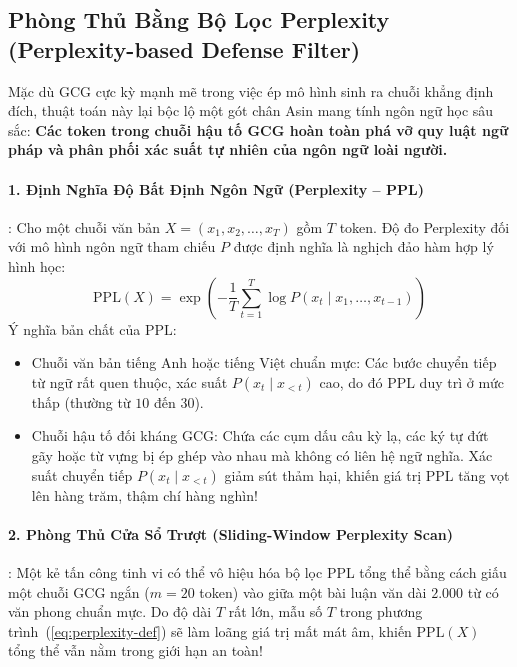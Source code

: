 \subsection{Phòng Thủ Bằng Bộ Lọc Perplexity (Perplexity-based Defense Filter)}
\label{subsec:perplexity-defense}

Mặc dù GCG cực kỳ mạnh mẽ trong việc ép mô hình sinh ra chuỗi khẳng định đích, thuật toán này lại bộc lộ một gót chân Asin mang tính ngôn ngữ học sâu sắc: \textbf{Các token trong chuỗi hậu tố GCG hoàn toàn phá vỡ quy luật ngữ pháp và phân phối xác suất tự nhiên của ngôn ngữ loài người.}

\paragraph{1. Định Nghĩa Độ Bất Định Ngôn Ngữ (Perplexity -- PPL)}:
Cho một chuỗi văn bản $X = (x_1, x_2, \dots, x_T)$ gồm $T$ token. Độ đo Perplexity đối với mô hình ngôn ngữ tham chiếu $P$ được định nghĩa là nghịch đảo hàm hợp lý hình học:
\begin{equation}
\text{PPL}(X) = \exp \left( - \frac{1}{T} \sum_{t=1}^T \log P(x_t \mid x_1, \dots, x_{t-1}) \right)
\label{eq:perplexity-def}
\end{equation}
Ý nghĩa bản chất của $\text{PPL}$:
\begin{itemize}
  \item Chuỗi văn bản tiếng Anh hoặc tiếng Việt chuẩn mực: Các bước chuyển tiếp từ ngữ rất quen thuộc, xác suất $P(x_t \mid x_{<t})$ cao, do đó $\text{PPL}$ duy trì ở mức thấp (thường từ $10$ đến $30$).
  \item Chuỗi hậu tố đối kháng GCG: Chứa các cụm dấu câu kỳ lạ, các ký tự đứt gãy hoặc từ vựng bị ép ghép vào nhau mà không có liên hệ ngữ nghĩa. Xác suất chuyển tiếp $P(x_t \mid x_{<t})$ giảm sút thảm hại, khiến giá trị $\text{PPL}$ tăng vọt lên hàng trăm, thậm chí hàng nghìn!
\end{itemize}

\paragraph{2. Phòng Thủ Cửa Sổ Trượt (Sliding-Window Perplexity Scan)}:
Một kẻ tấn công tinh vi có thể vô hiệu hóa bộ lọc PPL tổng thể bằng cách giấu một chuỗi GCG ngắn ($m=20$ token) vào giữa một bài luận văn dài $2.000$ từ có văn phong chuẩn mực. Do độ dài $T$ rất lớn, mẫu số $T$ trong phương trình~(\ref{eq:perplexity-def}) sẽ làm loãng giá trị mất mát âm, khiến $\text{PPL}(X)$ tổng thể vẫn nằm trong giới hạn an toàn!

